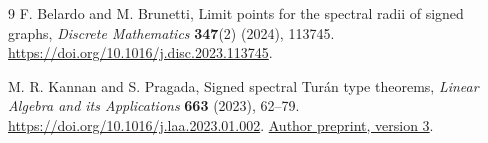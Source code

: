 \documentclass[11pt]{article}
\theoremstyle{remark}\newtheorem{remark}[theorem]{Remark}
\begin{document}
\begin{thebibliography}{9}
F. Belardo and M. Brunetti,
Limit points for the spectral radii of signed graphs,
\emph{Discrete Mathematics} \textbf{347}(2) (2024), 113745.
\url{https://doi.org/10.1016/j.disc.2023.113745}.

M. R. Kannan and S. Pragada,
Signed spectral Tur\'an type theorems,
\emph{Linear Algebra and its Applications} \textbf{663} (2023), 62--79.
\url{https://doi.org/10.1016/j.laa.2023.01.002}.
\href{https://arxiv.org/abs/2204.09870v3}{Author preprint, version 3}.

\end{thebibliography}
\end{document}
